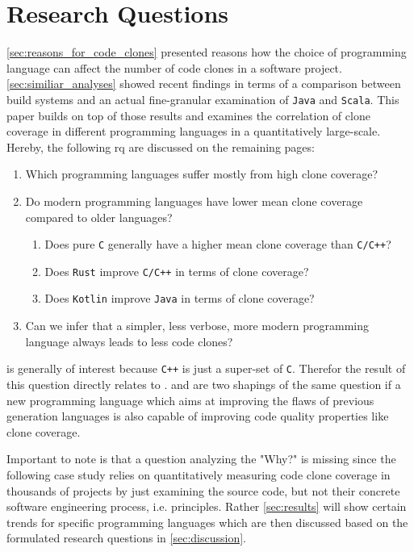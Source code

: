 
\section{Research Questions}
\label{sec:research_question}

\autoref{sec:reasons_for_code_clones} presented reasons how the choice of programming language can affect the number of code clones in a software project. \autoref{sec:similiar_analyses} showed recent findings in terms of a comparison between build systems and an actual fine-granular examination of \texttt{Java} and \texttt{Scala}.
This paper builds on top of those results and examines the correlation of clone coverage in different programming languages in a quantitatively large-scale. Hereby, the following \ac{rq} are discussed on the remaining pages:

\begin{enumerate}
	\item Which programming languages suffer mostly from high clone coverage? \label{question:clone_coverage_comparison}
	\item Do modern programming languages have lower mean clone coverage compared to older languages? \label{question:comparing_age}
	\begin{enumerate}
		\item Does pure \texttt{C} generally have a higher mean clone coverage than \texttt{C/C++}? \label{question:compare_c_cpp}
		\item Does \texttt{Rust} improve \texttt{C/C++} in terms of clone coverage? \label{question:compare_rust_c}
		\item Does \texttt{Kotlin} improve \texttt{Java} in terms of clone coverage? \label{question:compare_kotlin_java}
	\end{enumerate}
	\item Can we infer that a simpler, less verbose, more modern programming language always leads to less code clones? \label{question:always_less_clones}
\end{enumerate}

 is generally of interest because \texttt{C++} is just a super-set of \texttt{C}. Therefor the result of this question directly relates to .  and  are two shapings of the same question if a new programming language which aims at improving the flaws of previous generation languages is also capable of improving code quality properties like clone coverage.

Important to note is that a question analyzing the "Why?" is missing since the following case study relies on quantitatively measuring code clone coverage in thousands of projects by just examining the source code, but not their concrete software engineering process, i.e. principles. Rather \autoref{sec:results} will show certain trends for specific programming languages which are then discussed based on the formulated research questions in \autoref{sec:discussion}.